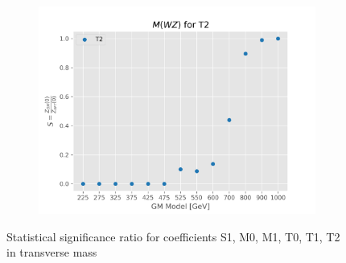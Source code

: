 \documentclass[../Bachelorarbeit.tex]{subfiles}
\begin{document}
\begin{figure}[h]
\begin{subfigure}{0.45\textwidth}
    \end{subfigure}
    \begin{subfigure}{0.45\textwidth}
        \includegraphics[width=\textwidth]{Plots/gm_relevanze/MTWZ_op_T2.png}
    \end{subfigure}
    \caption{Statistical significance ratio for coefficients S1, M0, M1, T0, T1, T2 in transverse  mass }
\end{figure}
\end{document}
